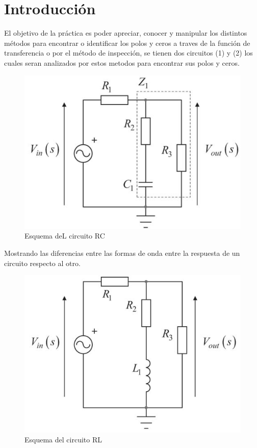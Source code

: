 \documentclass[letterpaper,10pt]{article}
\begin{document}
	\pagebreak
	\justify
	\pagebreak
	\section{Introducción}
	\vspace*{0.3in}
	El objetivo de la práctica es poder apreciar, conocer y manipular los distintos métodos para encontrar o identificar los polos y ceros a traves de la función de transferencia o por el método de inspección, se tienen dos circuitos (1) y (2) los cuales seran analizados por estos metodos para encontrar sus polos y ceros.
	
	\begin{figure}[h!]
		\centering
		\includegraphics[scale=0.4]{CIRCUITORC}
		\caption{Esquema deL circuito RC}
	\end{figure}
	
		\vspace*{0.3in}
	
	Mostrando las diferencias entre las formas de onda entre la respuesta de un circuito respecto al otro.
	
	\begin{figure}[h!]
		\centering
		\includegraphics[scale=0.4]{CIRCUITORL}
		\caption{Esquema del circuito RL}
	\end{figure}
\end{document}
